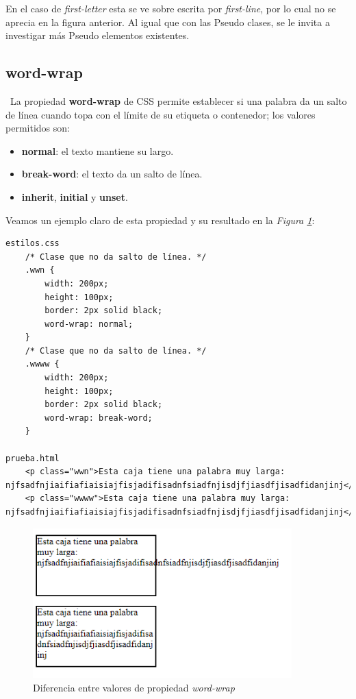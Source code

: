 En el caso de \textit{first-letter} esta se ve sobre escrita por \textit{first-line}, por lo cual no se aprecia en la figura anterior. Al igual que con las Pseudo clases, se le invita a investigar más Pseudo elementos existentes.


\subsection{word-wrap}
\
La propiedad \textbf{word-wrap} de CSS permite establecer si una palabra da un salto de línea cuando topa con el límite de su etiqueta o contenedor; los valores permitidos son:
\begin{itemize}
    \item \textbf{normal}: el texto mantiene su largo.
    \item \textbf{break-word}: el texto da un salto de línea.
    \item \textbf{inherit}, \textbf{initial} y \textbf{unset}.
\end{itemize}

Veamos un ejemplo claro de esta propiedad y su resultado en la \textit{Figura \ref{fig: 40}}:
\begin{lstlisting}
estilos.css
    /* Clase que no da salto de línea. */
    .wwn {
        width: 200px;
        height: 100px;
        border: 2px solid black;
        word-wrap: normal;
    }
    /* Clase que no da salto de línea. */
    .wwww {
        width: 200px;
        height: 100px;
        border: 2px solid black;
        word-wrap: break-word;
    }

prueba.html
    <p class="wwn">Esta caja tiene una palabra muy larga: njfsadfnjiaifiafiaisiajfisjadifisadnfsiadfnjisdjfjiasdfjisadfidanjinj</p>
    <p class="wwww">Esta caja tiene una palabra muy larga: njfsadfnjiaifiafiaisiajfisjadifisadnfsiadfnjisdjfjiasdfjisadfidanjinj</p>
\end{lstlisting}
\begin{figure}[H]
    \centering
    \caption{Diferencia entre valores de propiedad \textit{word-wrap}}
    \label{fig: 40}
    \includegraphics[width=10cm]{ss/word-wrap.png}
\end{figure}



